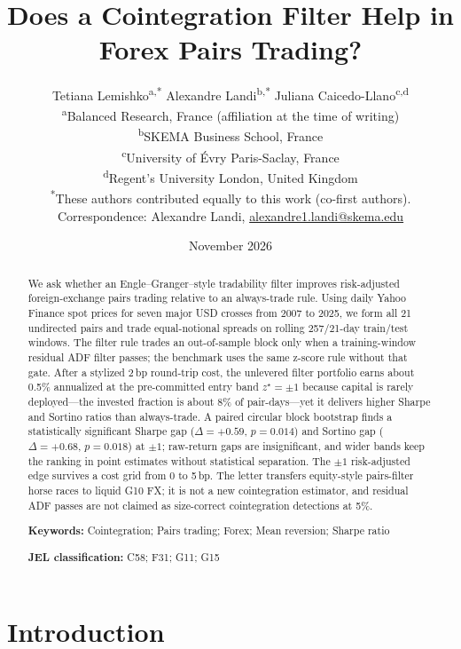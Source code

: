 \documentclass[11pt,a4paper]{article}
\title{Does a Cointegration Filter Help in Forex Pairs Trading?}
\author{%
Tetiana Lemishko\textsuperscript{a,*}%
\quad
Alexandre Landi\textsuperscript{b,*}%
\quad
Juliana Caicedo-Llano\textsuperscript{c,d}\\[0.6em]
{\normalsize
\textsuperscript{a}Balanced Research, France
(affiliation at the time of writing)\\
\textsuperscript{b}SKEMA Business School, France\\
\textsuperscript{c}University of \'Evry Paris-Saclay, France\\
\textsuperscript{d}Regent's University London, United Kingdom}\\[0.4em]
{\small\textsuperscript{*}These authors contributed equally to this work (co-first authors).}\\[0.35em]
{\normalsize
Correspondence: Alexandre Landi,
\href{mailto:alexandre1.landi@skema.edu}{alexandre1.landi@skema.edu}}
}
\date{November 2026}
\begin{document}
\maketitle

\begin{abstract}
We ask whether an Engle--Granger--style tradability filter improves risk-adjusted
foreign-exchange pairs trading relative to an always-trade rule. Using daily Yahoo Finance
spot prices for seven major USD crosses from 2007 to 2025, we form all 21 undirected pairs
and trade equal-notional spreads on rolling 257/21-day train/test windows. The filter rule
trades an out-of-sample block only when a training-window residual ADF filter passes; the
benchmark uses the same z-score rule without that gate. After a stylized 2\,bp round-trip
cost, the unlevered filter portfolio earns about 0.5\% annualized at the pre-committed
entry band $z^{\star}=\pm 1$ because capital is rarely deployed---the invested fraction is
about 8\% of pair-days---yet it delivers higher Sharpe and Sortino ratios than always-trade.
A paired circular block bootstrap finds a statistically significant Sharpe gap
($\Delta=+0.59$, $p=0.014$) and Sortino gap ($\Delta=+0.68$, $p=0.018$) at $\pm 1$;
raw-return gaps are insignificant, and wider bands keep the ranking in point estimates without
statistical separation. The $\pm 1$ risk-adjusted edge survives a cost grid from 0 to 5\,bp.
The letter transfers equity-style pairs-filter horse races to liquid G10 FX; it is not a new
cointegration estimator, and residual ADF passes are not claimed as size-correct
cointegration detections at 5\%.

\vspace{0.45em}
\noindent\textbf{Keywords:} Cointegration; Pairs trading; Forex; Mean reversion; Sharpe ratio

\noindent\textbf{JEL classification:} C58; F31; G11; G15
\end{abstract}

\section{Introduction}
\end{document}
